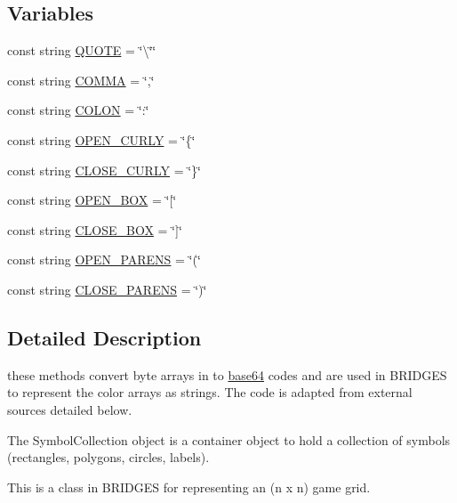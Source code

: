 \subsection*{Variables}
\begin{DoxyCompactItemize}
\item 
const string \hyperlink{namespacebridges_acd8357e88562cbb7e60bea3fac422ac3}{Q\+U\+O\+TE} = \char`\"{}\textbackslash{}\char`\"{}\char`\"{}
\item 
const string \hyperlink{namespacebridges_a74087afbaa635d3c3d837cc3b44c0162}{C\+O\+M\+MA} = \char`\"{},\char`\"{}
\item 
const string \hyperlink{namespacebridges_a039dca813ca3a9b4c8d8a866c6fa8445}{C\+O\+L\+ON} = \char`\"{}\+:\char`\"{}
\item 
const string \hyperlink{namespacebridges_a9bef552535e3f5bbfc2ca586cb5044c6}{O\+P\+E\+N\+\_\+\+C\+U\+R\+LY} = \char`\"{}\{\char`\"{}
\item 
const string \hyperlink{namespacebridges_aa0d8f65415cfe7cdca23401137d40ca9}{C\+L\+O\+S\+E\+\_\+\+C\+U\+R\+LY} = \char`\"{}\}\char`\"{}
\item 
const string \hyperlink{namespacebridges_a6b481335016325fe202a4e2fedd0af14}{O\+P\+E\+N\+\_\+\+B\+OX} = \char`\"{}\mbox{[}\char`\"{}
\item 
const string \hyperlink{namespacebridges_a9cbd20a3f223f32670280b954061f274}{C\+L\+O\+S\+E\+\_\+\+B\+OX} = \char`\"{}\mbox{]}\char`\"{}
\item 
const string \hyperlink{namespacebridges_ad909fb43b05ef6b7271fddbe85e2742a}{O\+P\+E\+N\+\_\+\+P\+A\+R\+E\+NS} = \char`\"{}(\char`\"{}
\item 
const string \hyperlink{namespacebridges_aff509a0d23b28c17004b1efd5a0a5920}{C\+L\+O\+S\+E\+\_\+\+P\+A\+R\+E\+NS} = \char`\"{})\char`\"{}
\end{DoxyCompactItemize}


\subsection{Detailed Description}
these methods convert byte arrays in to \hyperlink{namespacebridges_1_1base64}{base64} codes and are used in B\+R\+I\+D\+G\+ES to represent the color arrays as strings. The code is adapted from external sources detailed below. 

The Symbol\+Collection object is a container object to hold a collection of symbols (rectangles, polygons, circles, labels).

This is a class in B\+R\+I\+D\+G\+ES for representing an (n x n) game grid.

